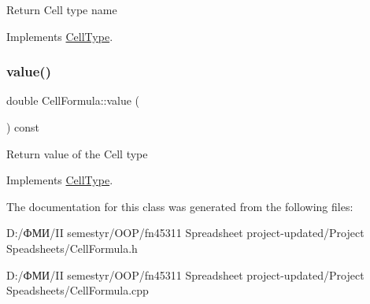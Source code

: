 Return Cell type name 

Implements \hyperlink{class_cell_type_ae31acfe1efc7776796d85918886247af}{Cell\+Type}.

\mbox{\label{class_cell_formula_a29d9e3000ae3f0b0ebac72807a455fec}} 
\subsubsection{\texorpdfstring{value()}{value()}}
{\footnotesize\ttfamily double Cell\+Formula\+::value (\begin{DoxyParamCaption}{ }\end{DoxyParamCaption}) const\hspace{0.3cm}{\ttfamily [virtual]}}

Return value of the Cell type 

Implements \hyperlink{class_cell_type_a6cbfc477f605049f2a007d8674442230}{Cell\+Type}.



The documentation for this class was generated from the following files\+:\begin{DoxyCompactItemize}
\item 
D\+:/ФМИ/\+I\+I semestyr/\+O\+O\+P/fn45311 Spreadsheet project-\/updated/\+Project Speadsheets/Cell\+Formula.\+h\item 
D\+:/ФМИ/\+I\+I semestyr/\+O\+O\+P/fn45311 Spreadsheet project-\/updated/\+Project Speadsheets/Cell\+Formula.\+cpp\end{DoxyCompactItemize}
